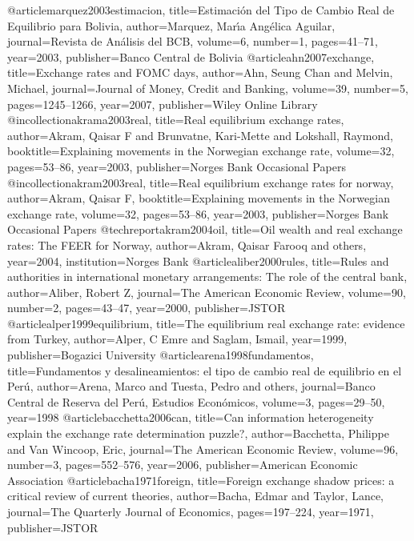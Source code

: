 @article{marquez2003estimacion,
  title={Estimaci{\'o}n del Tipo de Cambio Real de Equilibrio para Bolivia},
  author={Marquez, Mar{\'\i}a Ang{\'e}lica Aguilar},
  journal={Revista de An{\'a}lisis del BCB},
  volume={6},
  number={1},
  pages={41--71},
  year={2003},
  publisher={Banco Central de Bolivia}
}
@article{ahn2007exchange,
  title={Exchange rates and FOMC days},
  author={Ahn, Seung Chan and Melvin, Michael},
  journal={Journal of Money, Credit and Banking},
  volume={39},
  number={5},
  pages={1245--1266},
  year={2007},
  publisher={Wiley Online Library}
}
@incollection{akrama2003real,
  title={Real equilibrium exchange rates},
  author={Akram, Qaisar F and Brunvatne, Kari-Mette and Lokshall, Raymond},
  booktitle={Explaining movements in the Norwegian exchange rate},
  volume={32},
  pages={53--86},
  year={2003},
  publisher={Norges Bank Occasional Papers}
}
@incollection{akram2003real,
  title={Real equilibrium exchange rates for norway},
  author={Akram, Qaisar F},
booktitle={Explaining movements in the Norwegian exchange rate},
  volume={32},
  pages={53--86},
  year={2003},
  publisher={Norges Bank Occasional Papers}
}
@techreport{akram2004oil,
  title={Oil wealth and real exchange rates: The FEER for Norway},
  author={Akram, Qaisar Farooq and others},
  year={2004},
  institution={Norges Bank}
}
@article{aliber2000rules,
  title={Rules and authorities in international monetary arrangements: The role of the central bank},
  author={Aliber, Robert Z},
  journal={The American Economic Review},
  volume={90},
  number={2},
  pages={43--47},
  year={2000},
  publisher={JSTOR}
}
@article{alper1999equilibrium,
  title={The equilibrium real exchange rate: evidence from Turkey},
  author={Alper, C Emre and Saglam, Ismail},
  year={1999},
  publisher={Bogazici University}
}
@article{arena1998fundamentos,
  title={Fundamentos y desalineamientos: el tipo de cambio real de equilibrio en el Per{\'u}},
  author={Arena, Marco and Tuesta, Pedro and others},
  journal={Banco Central de Reserva del Per{\'u}, Estudios Econ{\'o}micos},
  volume={3},
  pages={29--50},
  year={1998}
}
@article{bacchetta2006can,
  title={Can information heterogeneity explain the exchange rate determination puzzle?},
  author={Bacchetta, Philippe and Van Wincoop, Eric},
  journal={The American Economic Review},
  volume={96},
  number={3},
  pages={552--576},
  year={2006},
  publisher={American Economic Association}
}
@article{bacha1971foreign,
  title={Foreign exchange shadow prices: a critical review of current theories},
  author={Bacha, Edmar and Taylor, Lance},
  journal={The Quarterly Journal of Economics},
  pages={197--224},
  year={1971},
  publisher={JSTOR}
}
